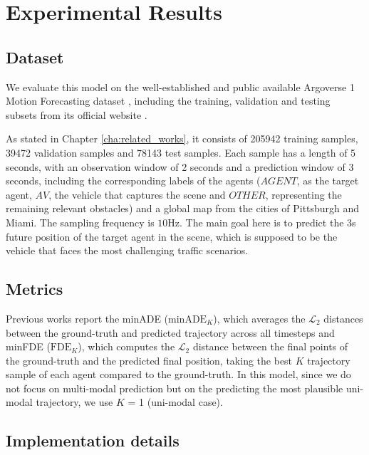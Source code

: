 \section{Experimental Results}
\label{sec:5_experimental_results}

\subsection{Dataset}
\label{subsec:5_dataset}

We evaluate this model on the well-established and public available Argoverse 1 Motion Forecasting dataset \cite{chang2019argoverse}, including the training, validation and testing subsets from its official website \cite{argobench}. 

As stated in Chapter \ref{cha:related_works}, it consists of 205942 training samples, 39472 validation samples and 78143 test samples. Each sample has a length of 5 seconds, with an observation window of 2 seconds and a prediction window of 3 seconds, including the corresponding labels of the agents ($AGENT$, as the target agent, $AV$, the vehicle that captures the scene and $OTHER$, representing the remaining relevant obstacles) and a global map from the cities of Pittsburgh and Miami. The sampling frequency is $10\mathrm{Hz}$. The main goal here is to predict the 3s future position of the target agent in the scene, which is supposed to be the vehicle that faces the most challenging traffic scenarios.

\subsection{Metrics}
\label{subsec:5_metrics}

Previous works \cite{chai2019multipath, mercat2020multi, sadeghian2019sophie} report the \ac{minADE} ($\text{minADE}_K$), which averages the $\mathcal{L}_2$ distances between the ground-truth and predicted trajectory across all timesteps and \ac{minFDE} ($\text{FDE}_K$), which computes the $\mathcal{L}_2$ distance between the final points of the ground-truth and the predicted final position, taking the best $K$ trajectory sample of each agent compared to the ground-truth. In this model, since we do not focus on multi-modal prediction but on the predicting the most plausible uni-modal trajectory, we use $K$ = 1 (uni-modal case).

\subsection{Implementation details}
\label{subsec:5_implementation_details}

